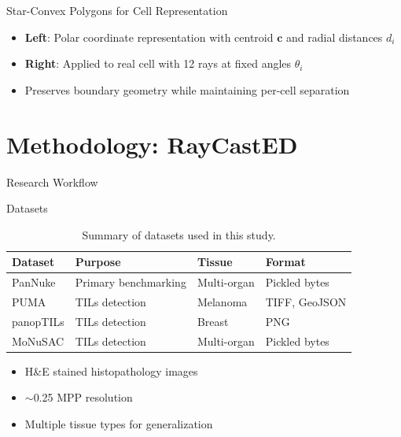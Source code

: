 \documentclass[aspectratio=169, 10pt]{beamer}
\begin{document}
\begin{frame}{Star-Convex Polygons for Cell Representation}
\begin{center}
  \end{center}

  \begin{itemize}
    \item \textbf{Left}: Polar coordinate representation with centroid $\mathbf{c}$ and radial distances $d_i$
    \item \textbf{Right}: Applied to real cell with 12 rays at fixed angles $\theta_i$
    \item Preserves boundary geometry while maintaining per-cell separation
  \end{itemize}
\end{frame}

\section{Methodology: RayCastED}

\begin{frame}{Research Workflow}
  \begin{center}
    \resizebox{0.75\textwidth}{!}{}
  \end{center}

\end{frame}

\begin{frame}{Datasets}
  \begin{table}
    \centering
    \begin{tabular}{llll}
      \toprule
      \textbf{Dataset} & \textbf{Purpose} & \textbf{Tissue} & \textbf{Format} \\
      \midrule
      PanNuke & Primary benchmarking & Multi-organ & Pickled bytes \\
      PUMA & TILs detection & Melanoma & TIFF, GeoJSON \\
      panopTILs & TILs detection & Breast & PNG \\
      MoNuSAC & TILs detection & Multi-organ & Pickled bytes \\
      \bottomrule
    \end{tabular}
    \caption{Summary of datasets used in this study.}
  \end{table}

  \begin{itemize}
    \item H\&E stained histopathology images
    \item $\sim$0.25 MPP resolution
    \item Multiple tissue types for generalization
  \end{itemize}
\end{frame}
\end{document}
